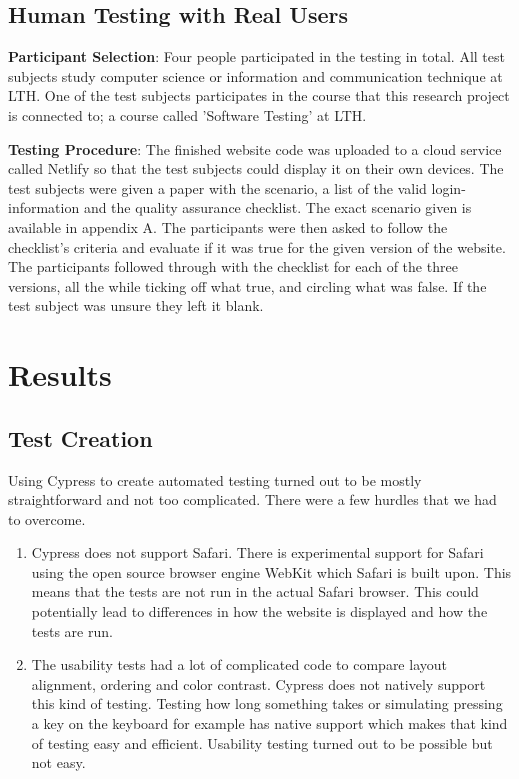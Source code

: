 \documentclass[journal,twocolumn]{IEEEtran}
\begin{document}
\subsection{Human Testing with Real Users}
\textbf{Participant Selection}: Four people participated in the testing in total. All test subjects study computer science or information and communication technique at LTH. One of the test subjects participates in the course that this research project is connected to; a course called 'Software Testing' at LTH.

\textbf{Testing Procedure}:
The finished website code was uploaded to a cloud service called Netlify so that the test subjects could display it on their own devices. The test subjects were given a paper with the scenario, a list of the valid login-information and the quality assurance checklist. The exact scenario given is available in appendix A. The participants were then asked to follow the checklist's criteria and evaluate if it was true for the given version of the website. The participants followed through with the checklist for each of the three versions, all the while ticking off what true, and circling what was false. If the test subject was unsure they left it blank.

\section{Results}
\subsection{Test Creation}
Using Cypress to create automated testing turned out to be mostly straightforward and not too complicated. There were a few hurdles that we had to overcome.

\begin{enumerate}
    \item Cypress does not support Safari. There is experimental support for Safari using the open source browser engine WebKit which Safari is built upon. This means that the tests are not run in the actual Safari browser. This could potentially lead to differences in how the website is displayed and how the tests are run.
    \item The usability tests had a lot of complicated code to compare layout alignment, ordering and color contrast. Cypress does not natively support this kind of testing. Testing how long something takes or simulating pressing a key on the keyboard for example has native support which makes that kind of testing easy and efficient. Usability testing turned out to be possible but not easy.
\end{enumerate}
\end{document}
